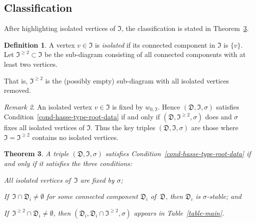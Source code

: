 \documentclass[11pt]{amsart}
\numberwithin{equation}{section}
\newtheorem{theorem}{Theorem}[section]
\theoremstyle{definition}
\newtheorem{definition}[theorem]{Definition}
\theoremstyle{remark}
\newtheorem{rmk}[theorem]{Remark}
\newcommand{\Dfr}{{\mathfrak D}}
\newcommand{\Ifr}{{\mathfrak I}}
\begin{document}
\subsection{Classification}
After highlighting isolated vertices of $\Ifr$, the classification is stated in Theorem~\ref{th-sigma-triv}.

\begin{definition}
A vertex $v \in \Ifr$ is \emph{isolated} 
if its connected component in $\Ifr$ is $\{v\}$. Let $\Ifr^{\geq 2} \subset \Ifr$ be the sub-diagram consisting of all connected components with at least two vertices.
\end{definition}

That is, $\Ifr^{\geq 2}$ is the (possibly empty) sub-diagram with all isolated vertices removed.  

\begin{rmk}
\label{rmk-isolated}
An isolated vertex $v \in \Ifr$ is fixed by $w_{0,\Ifr}$. Hence $(\Dfr, \Ifr, \sigma)$ satisfies Condition~\ref{cond-hasse-type-root-data} if and only if $(\Dfr, \Ifr^{\geq 2}, \sigma)$ does and $\sigma$ fixes all isolated vertices of $\Ifr$. 
Thus the key triples $(\Dfr, \Ifr, \sigma)$ are those where $\Ifr=\Ifr^{\geq 2}$ contains no isolated vertices. 
\end{rmk}

\begin{theorem}
\label{th-sigma-triv}
A triple $(\Dfr, \Ifr, \sigma)$ satisfies Condition~\ref{cond-hasse-type-root-data} if and only if it satisfies the three conditions: 
\begin{alist}
\item 
\label{item-isolated}
All isolated vertices of\, $\Ifr$ are fixed by $\sigma$; 
\item If\, 
\label{item-sigma-stable}
$\Ifr \cap \Dfr_i \neq \emptyset$ for some connected component $\Dfr_i$ of\, $\Dfr$, then $\Dfr_i$ is $\sigma$-stable; and 
\item 
\label{item-table}
If\, $\Ifr^{\geq 2} \cap \Dfr_i \neq \emptyset$, then 
$(\Dfr_i, \Dfr_i \cap \Ifr^{\geq 2},\sigma)$ appears in Table~\ref{table-main}.
\end{alist}
\end{theorem}
\end{document}
